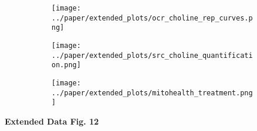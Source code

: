 \begin{figure}[H]
    \begin{subfigure}[t]{.25\textwidth}
        \caption{}
        \texttt{[image: ../paper/extended\_plots/ocr\_choline\_rep\_curves.png]}        
    \end{subfigure}
    \begin{subfigure}[t]{.22\textwidth}
        \caption{}
        \texttt{[image: ../paper/extended\_plots/src\_choline\_quantification.png]}        
    \end{subfigure}
    \hspace{.25cm}
    \begin{subfigure}[t]{.45\textwidth}
        \caption{}
        \texttt{[image: ../paper/extended\_plots/mitohealth\_treatment.png]}        
    \end{subfigure}
\end{figure}
\textbf{Extended Data Fig. 12}